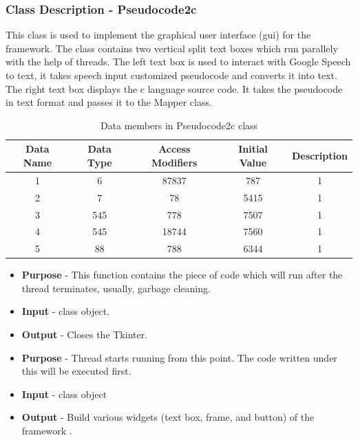\documentclass[12pt]{article}
\renewcommand{\thetable}{\arabic{section}(\alph{table})}
\renewcommand{\thetable}{\arabic{section}.\arabic{subsection}(\alph{table})}
\renewcommand{\thetable}{\arabic{section}.\arabic{subsection}.\arabic{subsubsection}(\alph{table})}
\newcounter{subsubsubsection}[subsubsection]
\begin{document}
\subsubsection{Class Description - Pseudocode2c}

This class is used to implement the graphical user interface (gui) for the framework. The class contains two vertical split text boxes which run parallely with the help of threads. The left text box is used to interact with Google Speech to text, it takes speech input customized pseudocode and converts it into text. The right text box displays the c language source code. It takes the pseudocode in text format and passes it to the Mapper class.

\renewcommand{\thetable}{\arabic{section}.\arabic{subsection}.\arabic{subsubsection}}
\begin{table}[H]
\centering
\begin{tabular}{|c c c c c|} 
 \hline
 Data Name & Data Type & Access Modifiers & Initial Value & Description \\ [0.5ex] 
 \hline\hline
 1 & 6 & 87837 & 787 & 1 \\ 
 2 & 7 & 78 & 5415 & 1 \\
 3 & 545 & 778 & 7507 & 1\\
 4 & 545 & 18744 & 7560 & 1\\
 5 & 88 & 788 & 6344 & 1\\ [1ex] 
 \hline
\end{tabular}
\caption{Data members in Pseudocode2c class}
\end{table}

\begin{itemize}
    \setlength{\itemsep}{1pt}
    \item \textbf{Purpose} - This function contains the piece of code which will run after the thread terminates, usually, garbage cleaning.
    \item \textbf{Input} - class object.
    \item \textbf{Output} - Closes the Tkinter.
\end{itemize}

\begin{itemize}
    \setlength{\itemsep}{1pt}
    \item \textbf{Purpose} - Thread starts running from this point. The code written under this will be executed first.
    \item \textbf{Input} - class object
    \item \textbf{Output} - Build various widgets (text box, frame, and button) of the framework .
\end{itemize}
\end{document}
